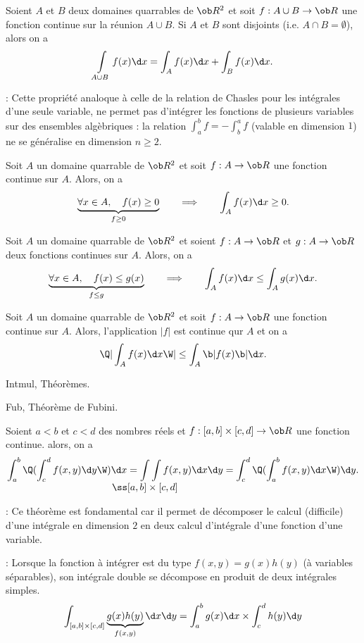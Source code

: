 \Propriete [Title=Additivité par rapport au domaine d'intégration] 
Soient $A$ et $B$ deux domaines quarrables de $\ob R^2$ et soit $f:A\cup B\to\ob R$ une fonction continue 
sur la réunion $A\cup B$. Si $A$ et $B$ sont disjoints (i.e. $A\cap B=\emptyset$), alors on a 
$$
\int\limits_{A\cup B}f(x)\d x=\int_Af(x)\d x+\int_Bf(x)\d x. 
$$

\Remarque : Cette propriété analoque à celle de la relation de Chasles pour les intégrales d'une seule variable, ne permet pas d'intégrer les fonctions de plusieurs variables sur des ensembles algèbriques : la relation $\int_a^bf=-\int_b^af$ (valable en dimension $1$) ne se généralise en dimension $n\ge2$. 
\bigskip

\Propriete[Title=positivité de l'intégrale] Soit $A$ un domaine quarrable de $\ob R^2$ et soit $f: A\to\ob R$ une fonction continue sur $A$. Alors, on a 
$$
\underbrace{
\forall x\in A,\quad f(x)\ge0}_{f\ge0}\qquad\Longrightarrow\qquad \int_Af(x)\d x\ge0.
$$ 


\Propriete[Title=Croissance de l'intégrale]Soit $A$ un domaine quarrable de $\ob R^2$ et soient $f: A\to\ob R$ et $g:A\to\ob R$ deux fonctions continues sur $A$. 
Alors, on a 
$$
\underbrace{
\forall x\in A,\quad f(x)\le g(x)}_{f\le g}\qquad\Longrightarrow\qquad \int_Af(x)\d x\le \int_Ag(x)\d x.
$$ 

\Propriete[Title=Valeur absolue]Soit $A$ un domaine quarrable de $\ob R^2$ et soit $f: A\to\ob R$ une fonction continue sur $A$. Alors, 
l'application $|f|$ est continue qur $A$ et on a 
$$
\Q|\int_Af(x)\d x\W|\le \int_A\b|f(x)\b|\d x.
$$

\Section Intmul, Théorèmes. 

\Subsection Fub, Théorème de Fubini. 

\Theoreme [Title=Théorème de Fubini]
Soient $a< b$ et $c<d$ des nombres réels et $f:[a,b]\times[c,d]\to\ob R$ une fonction continue. alors, on a 
$$
\int_a^b\Q(\int_c^df(x,y)\d y\W)\d x=\int\int\limits_{\llap{$\ss[a,b]\times[c,d]$}}f(x,y)\d x\d y=\int_c^d\Q(\int_a^bf(x,y)\d x\W)\d y.
$$

 : Ce théorème est fondamental car il permet de décomposer le calcul (difficile) d'une intégrale en dimension $2$ en deux calcul d'intégrale d'une fonction d'une variable. 
\bigskip

 : Lorsque la fonction à intégrer est du type $f(x,y)=g(x)h(y)$ (à variables séparables), son intégrale double 
se décompose en produit de deux intégrales simples. 
$$
\int_{[a,b]\times[c,d]}\underbrace{g(x)h(y)}_{f(x,y)}\d x\d y=\int_a^bg(x)\d x\times\int_c^dh(y)\d y
$$

